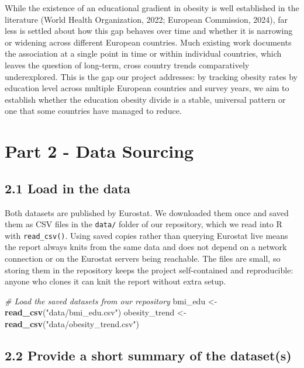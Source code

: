 \documentclass[
]{article}
\newenvironment{Shaded}{\begin{snugshade}}{\end{snugshade}}
\newcommand{\CommentTok}[1]{\textcolor[rgb]{0.56,0.35,0.01}{\textit{#1}}}
\newcommand{\FunctionTok}[1]{\textcolor[rgb]{0.13,0.29,0.53}{\textbf{#1}}}
\newcommand{\NormalTok}[1]{#1}
\newcommand{\OtherTok}[1]{\textcolor[rgb]{0.56,0.35,0.01}{#1}}
\newcommand{\StringTok}[1]{\textcolor[rgb]{0.31,0.60,0.02}{#1}}
\begin{document}
While the existence of an educational gradient in obesity is well
established in the literature (World Health Organization, 2022; European
Commission, 2024), far less is settled about how this gap behaves over
time and whether it is narrowing or widening across different European
countries. Much existing work documents the association at a single
point in time or within individual countries, which leaves the question
of long-term, cross country trends comparatively underexplored. This is
the gap our project addresses: by tracking obesity rates by education
level across multiple European countries and survey years, we aim to
establish whether the education obesity divide is a stable, universal
pattern or one that some countries have managed to reduce.

\section{Part 2 - Data Sourcing}\label{part-2---data-sourcing}

\subsection{2.1 Load in the data}\label{load-in-the-data}

Both datasets are published by Eurostat. We downloaded them once and
saved them as CSV files in the \texttt{data/} folder of our repository,
which we read into R with \texttt{read\_csv()}. Using saved copies
rather than querying Eurostat live means the report always knits from
the same data and does not depend on a network connection or on the
Eurostat servers being reachable. The files are small, so storing them
in the repository keeps the project self-contained and reproducible:
anyone who clones it can knit the report without extra setup.

\begin{Shaded}
\begin{Highlighting}[]

\CommentTok{\# Load the saved datasets from our repository}
\NormalTok{bmi\_edu }\OtherTok{\textless{}{-}} \FunctionTok{read\_csv}\NormalTok{(}\StringTok{"data/bmi\_edu.csv"}\NormalTok{)}
\NormalTok{obesity\_trend }\OtherTok{\textless{}{-}} \FunctionTok{read\_csv}\NormalTok{(}\StringTok{"data/obesity\_trend.csv"}\NormalTok{)}
\end{Highlighting}
\end{Shaded}

\subsection{2.2 Provide a short summary of the
dataset(s)}\label{provide-a-short-summary-of-the-datasets}
\end{document}
